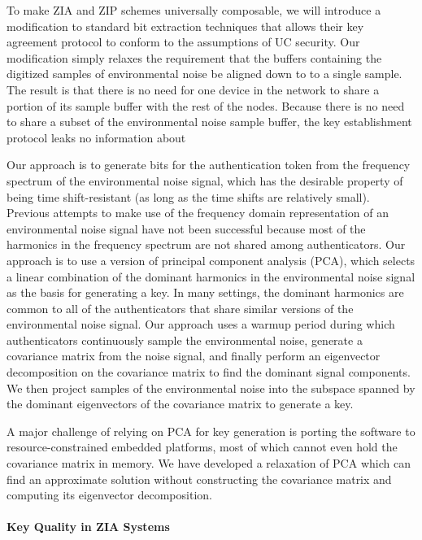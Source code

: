 \documentclass[10pt,onecolumn]{article}
\begin{document}
To make ZIA and ZIP schemes universally composable, we will introduce a modification to standard bit extraction techniques that allows their key agreement protocol to conform to the assumptions of UC security.
Our modification simply relaxes the requirement that the buffers containing the digitized samples of environmental noise be aligned down to to a single sample.
The result is that there is no need for one device in the network to share a portion of its sample buffer with the rest of the nodes.
Because there is no need to share a subset of the environmental noise sample buffer, the key establishment protocol leaks no information about 

Our approach is to generate bits for the authentication token from the frequency spectrum of the environmental noise signal, which has the desirable property of being time shift-resistant (as long as the time shifts are relatively small).
Previous attempts to make use of the frequency domain representation of an environmental noise signal have not been successful because most of the harmonics in the frequency spectrum are not shared among authenticators.
Our approach is to use a version of principal component analysis (PCA), which selects a linear combination of the dominant harmonics in the environmental noise signal as the basis for generating a key.
In many settings, the dominant harmonics are common to all of the authenticators that share similar versions of the environmental noise signal.
Our approach uses a warmup period during which authenticators continuously sample the environmental noise, generate a covariance matrix from the noise signal, and finally perform an eigenvector decomposition on the covariance matrix to find the dominant signal components.
We then project samples of the environmental noise into the subspace spanned by the dominant eigenvectors of the covariance matrix to generate a key.

A major challenge of relying on PCA for key generation is porting the software to resource-constrained embedded platforms, most of which cannot even hold the covariance matrix in memory.
We have developed a relaxation of PCA which can find an approximate solution without constructing the covariance matrix and computing its eigenvector decomposition.




\paragraph{Key Quality in ZIA Systems}
\end{document}

